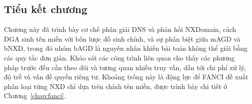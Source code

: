 \subsection{Tiểu kết chương}

Chương này đã trình bày cơ chế phân giải DNS và phản hồi NXDomain, cách DGA sinh tên miền với bốn lược đồ sinh chính, và sự phân biệt giữa mAGD và bNXD, trong đó nhóm bAGD là nguyên nhân khiến bài toán không thể giải bằng các quy tắc đơn giản. Khảo sát các công trình liên quan cho thấy các phương pháp trước đều cần theo dõi và tương quan nhiều truy vấn, dẫn tới chi phí xử lý, độ trễ và vấn đề quyền riêng tư. Khoảng trống này là động lực để FANCI đề xuất phân loại từng NXD chỉ dựa trên chính tên miền, được trình bày chi tiết ở Chương~\ref{chap:fanci}.
